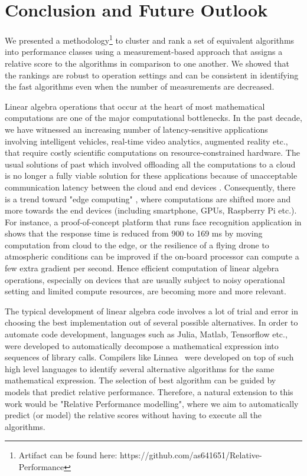 \documentclass[conference]{IEEEtran}
\begin{document}
\section{Conclusion and Future Outlook}
\label{sec:con}
We presented a methodology\footnote{Artifact can be found here: https://github.com/as641651/Relative-Performance  } to cluster and rank a set of equivalent algorithms into performance classes using a measurement-based approach that assigns a relative score to the algorithms in comparison to one another. We showed that the rankings are robust to operation settings and can be consistent in identifying the fast algorithms even when the number of measurements are decreased. 

Linear algebra operations that occur at the heart of most mathematical computations are one of the major computational bottlenecks.  In the past decade, we have witnessed an increasing number of latency-sensitive applications involving intelligent vehicles\cite{connectedvehicles}, real-time video analytics\cite{videoanalytics}, augmented reality\cite{arvr} etc., that require costly scientific computations on resource-constrained hardware. The usual solutions of past which involved offloading all the computations to a cloud is no longer a fully viable solution for these applications because of unacceptable communication latency between the cloud and end devices\cite{surveyMCC} \cite{towardsEdgeComputing}. Consequently, there is a trend toward "edge computing" \cite{edgeComputing2016} \cite{towardsEdgeComputing} \cite{edgeComputing2015}, where computations are shifted more and more towards the end devices (including smartphone, GPUs, Raspberry Pi etc.). For instance, a proof-of-concept platform that runs face recognition application in \cite{facerecog} shows that the response time is reduced from 900 to 169 ms by moving computation from cloud to the edge, or the resilience of a flying drone to atmospheric conditions can be improved if the on-board processor can compute a few extra gradient per second. Hence efficient computation of linear algebra operations, especially on devices that are usually subject to noisy operational setting and limited compute resources, are becoming more and more relevant.  

The typical development of linear algebra code involves a lot of trial and error in choosing the best implementation out
of several possible alternatives. In order to automate code development, languages such as Julia\cite{julia}, Matlab\cite{MatlabOTB}, Tensorflow\cite{tensorflow} etc., were developed to automatically decompose a mathematical expression into sequences of library calls. Compilers like Linnea~\cite{barthels2019linnea} were developed on top of such high level languages to identify several alternative algorithms for the same mathematical expression. The selection of best algorithm can be guided by models that predict relative performance. Therefore, a natural extension to this work would be "Relative Performance modelling", where we aim to automatically predict (or model) the relative scores without having to execute all the algorithms.
\end{document}
